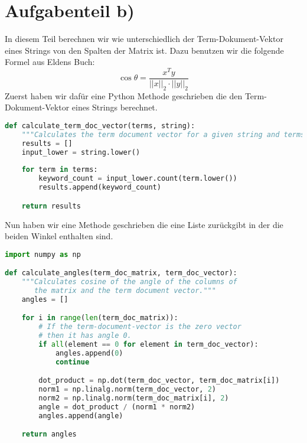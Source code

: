 \documentclass{article}
\begin{document}
\section*{Aufgabenteil b)}
In diesem Teil berechnen wir wie unterschiedlich der Term-Dokument-Vektor eines Strings von den Spalten der Matrix ist. Dazu benutzen wir die folgende Formel aus Eldens Buch:$$\cos\theta=\frac{x^Ty}{||x||_2\cdot||y||_2}$$ Zuerst haben wir dafür eine Python Methode geschrieben die den Term-Dokument-Vektor eines Strings berechnet.
\begin{center}
\begin{minipage}{0.8\linewidth}
\begin{lstlisting}[language=Python]
def calculate_term_doc_vector(terms, string):
    """Calculates the term document vector for a given string and terms."""
    results = []
    input_lower = string.lower()
    
    for term in terms:
        keyword_count = input_lower.count(term.lower())
        results.append(keyword_count)

    return results
\end{lstlisting}
\end{minipage}
\end{center}
Nun haben wir eine Methode geschrieben die eine Liste zurückgibt in der die beiden Winkel enthalten sind.
\begin{center}
\begin{minipage}{0.8\linewidth}
\begin{lstlisting}[language=Python]
import numpy as np

def calculate_angles(term_doc_matrix, term_doc_vector):
    """Calculates cosine of the angle of the columns of 
       the matrix and the term document vector."""
    angles = []

    for i in range(len(term_doc_matrix)):
        # If the term-document-vector is the zero vector
        # then it has angle 0.
        if all(element == 0 for element in term_doc_vector):
            angles.append(0)
            continue

        dot_product = np.dot(term_doc_vector, term_doc_matrix[i])
        norm1 = np.linalg.norm(term_doc_vector, 2)
        norm2 = np.linalg.norm(term_doc_matrix[i], 2)
        angle = dot_product / (norm1 * norm2)
        angles.append(angle)

    return angles
\end{lstlisting}
\end{minipage}
\end{center}\newpage
\end{document}
